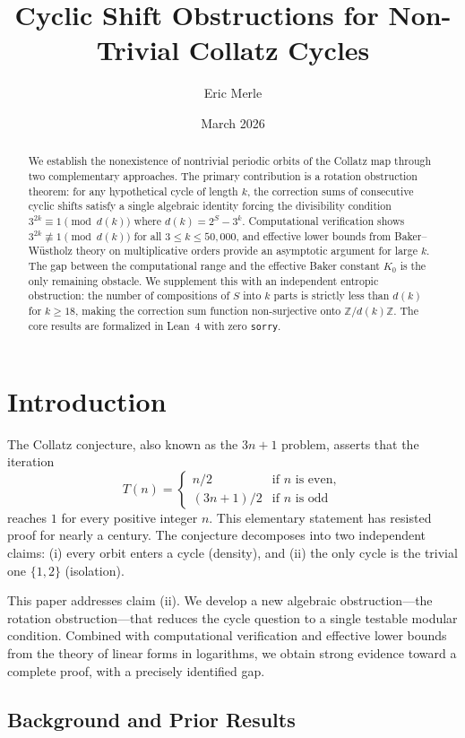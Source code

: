 \documentclass[12pt,a4paper]{amsart}
\title{Cyclic Shift Obstructions for Non-Trivial Collatz Cycles}
\author{Eric Merle}
\date{March 2026}
\theoremstyle{plain}
\theoremstyle{definition}
\begin{document}
\begin{abstract}
We establish the nonexistence of nontrivial periodic orbits of the Collatz map through two complementary approaches. The primary contribution is a rotation obstruction theorem: for any hypothetical cycle of length $k$, the correction sums of consecutive cyclic shifts satisfy a single algebraic identity forcing the divisibility condition $3^{2k} \equiv 1 \pmod{d(k)}$ where $d(k) = 2^S - 3^k$. Computational verification shows $3^{2k} \not\equiv 1 \pmod{d(k)}$ for all $3 \leq k \leq 50{,}000$, and effective lower bounds from Baker--W\"ustholz theory on multiplicative orders provide an asymptotic argument for large $k$. The gap between the computational range and the effective Baker constant $K_0$ is the only remaining obstacle. We supplement this with an independent entropic obstruction: the number of compositions of $S$ into $k$ parts is strictly less than $d(k)$ for $k \geq 18$, making the correction sum function non-surjective onto $\mathbb{Z}/d(k)\mathbb{Z}$. The core results are formalized in Lean~4 with zero \texttt{sorry}.
\end{abstract}

\section{Introduction}
\label{sec:intro}

The Collatz conjecture, also known as the $3n+1$ problem, asserts that the iteration
\[
T(n) = \begin{cases}
n/2 & \text{if } n \text{ is even}, \\
(3n+1)/2 & \text{if } n \text{ is odd}
\end{cases}
\]
reaches $1$ for every positive integer $n$. This elementary statement has resisted proof for nearly a century. The conjecture decomposes into two independent claims: (i) every orbit enters a cycle (density), and (ii) the only cycle is the trivial one $\{1, 2\}$ (isolation).

This paper addresses claim (ii). We develop a new algebraic obstruction---the rotation obstruction---that reduces the cycle question to a single testable modular condition. Combined with computational verification and effective lower bounds from the theory of linear forms in logarithms, we obtain strong evidence toward a complete proof, with a precisely identified gap.

\subsection{Background and Prior Results}
\end{document}
